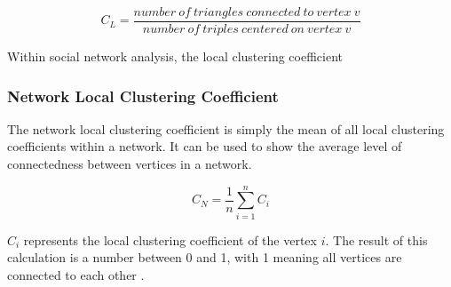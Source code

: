\begin{equation}
C_L = \frac{number\: of\: triangles\: connected\: to\: vertex\: v}{number\: of\: triples\: centered\: on\: vertex\: v}
\label{eq:localcc}
\end{equation}

Within social network analysis, the local clustering coefficient

\subsubsection{Network Local Clustering Coefficient}
The network local clustering coefficient is simply the mean of all local clustering coefficients within a network. It can be used to show the average level of connectedness between vertices in a network.

\begin{equation}
C_N = \frac{1}{n}\sum_{i=1}^{n} C_i
\label{eq:networkcc}
\end{equation}

$C_i$ represents the local clustering coefficient of the vertex $i$. The result of this calculation is a number between 0 and 1, with 1 meaning all vertices are connected to each other \cite{watts98}.
